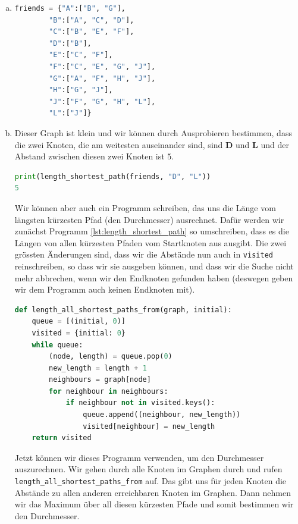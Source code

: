 \begin{enumerate}[(a)]
\begin{figure}[H]
\begin{subfigure}[h]{0.6\textwidth}
    \end{subfigure}
\end{figure}
\item 
\begin{lstlisting}[language=Python, caption={Freundschaftsgraph in der Liste der Nachbarn Darstellung.}]
friends = {"A":["B", "G"],
        "B":["A", "C", "D"],
        "C":["B", "E", "F"],
        "D":["B"],
        "E":["C", "F"],
        "F":["C", "E", "G", "J"],
        "G":["A", "F", "H", "J"],
        "H":["G", "J"],
        "J":["F", "G", "H", "L"],
        "L":["J"]}
\end{lstlisting}
\item Dieser Graph ist klein und wir können durch Ausprobieren bestimmen, dass die zwei Knoten, die am weitesten auseinander sind, sind \textbf{D} und \textbf{L} und der Abstand zwischen diesen zwei Knoten ist \(5\).
\begin{lstlisting}[language=Python]
print(length_shortest_path(friends, "D", "L"))
5
\end{lstlisting}
Wir können aber auch ein Programm schreiben, das uns die Länge vom längsten kürzesten Pfad (den Durchmesser) ausrechnet. Dafür werden wir zunächst Programm \ref{lst:length_shortest_path} so umschreiben, dass es die Längen von allen kürzesten Pfaden vom Startknoten aus ausgibt. Die zwei grössten Änderungen sind, dass wir die Abstände nun auch in \texttt{visited} reinschreiben, so dass wir sie ausgeben können, und dass wir die Suche nicht mehr abbrechen, wenn wir den Endknoten gefunden haben (deswegen geben wir dem Programm auch keinen Endknoten mit).
\begin{lstlisting}[language=Python, caption={Programm, welches die Abstände vom Startknoten zu allen anderen erreichbaren Knoten ausrechnet}]
def length_all_shortest_paths_from(graph, initial):
    queue = [(initial, 0)]
    visited = {initial: 0}
    while queue:
        (node, length) = queue.pop(0)
        new_length = length + 1
        neighbours = graph[node]
        for neighbour in neighbours:
            if neighbour not in visited.keys():
                queue.append((neighbour, new_length))
                visited[neighbour] = new_length
    return visited
\end{lstlisting}
Jetzt können wir dieses Programm verwenden, um den Durchmesser auszurechnen. Wir gehen durch alle Knoten im Graphen durch und rufen \texttt{length\_all\_shortest\_paths\_from} auf. Das gibt uns für jeden Knoten die Abstände zu allen anderen erreichbaren Knoten im Graphen. Dann nehmen wir das Maximum über all diesen kürzesten Pfade und somit bestimmen wir den Durchmesser.

\end{enumerate}
